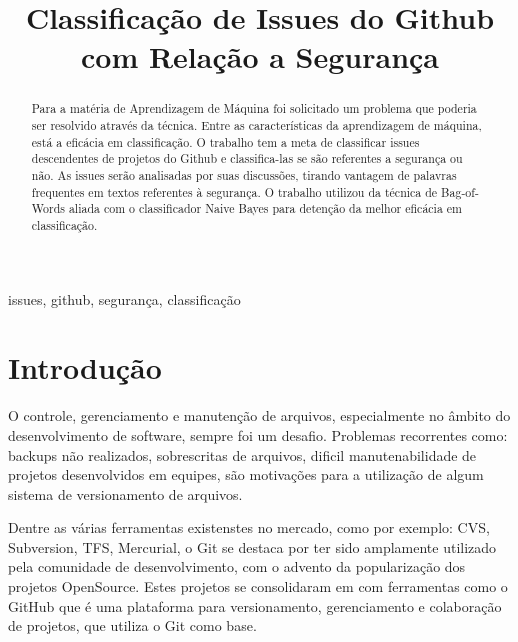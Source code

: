 \documentclass[conference]{IEEEtran}
\begin{document}
\title{Classificação de Issues do Github com Relação a Segurança}

\author{
    \and
}

\maketitle

\begin{abstract}
    Para a matéria de Aprendizagem de Máquina foi solicitado um problema que poderia ser resolvido através da técnica. Entre as características da aprendizagem de máquina, está a eficácia em classificação. O trabalho tem a meta de classificar issues descendentes de projetos do Github e classifica-las se são referentes a segurança ou não. As issues serão analisadas por suas discussões, tirando vantagem de palavras frequentes em textos referentes à segurança. O trabalho utilizou da técnica de Bag-of-Words aliada com o classificador Naive Bayes para detenção da melhor eficácia em classificação.
\end{abstract}

\begin{IEEEkeywords}
    issues, github, segurança, classificação
\end{IEEEkeywords}

\section{Introdução}

O controle, gerenciamento e manutenção de arquivos, especialmente no âmbito do desenvolvimento de software, sempre foi um desafio. Problemas recorrentes como: backups não realizados, sobrescritas de arquivos, dificil manutenabilidade de projetos desenvolvidos em equipes, são motivações para a utilização de algum sistema de versionamento de arquivos. \cite{Scott:ProGit}

Dentre as várias ferramentas existenstes no mercado, como por exemplo: CVS, Subversion, TFS, Mercurial, o Git se destaca por ter sido amplamente utilizado pela comunidade de desenvolvimento, com o advento da popularização dos projetos OpenSource. Estes projetos se consolidaram em com ferramentas como o GitHub que é uma plataforma para versionamento, gerenciamento e colaboração de projetos, que utiliza o Git como base.
\end{document}
